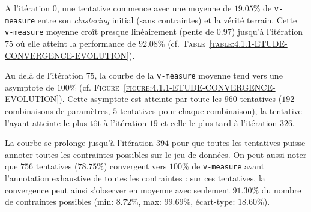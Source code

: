 			A l'itération $0$, une tentative commence avec une moyenne de $19.05$\% de \texttt{v-measure}  entre son \textit{clustering} initial (sans contraintes) et la vérité terrain.
			Cette \texttt{v-measure} moyenne croît presque linéairement (pente de $0.97$) jusqu'à l'itération $75$ où elle atteint la performance de $92.08$\% (cf. \textsc{Table~\ref{table:4.1.1-ETUDE-CONVERGENCE-EVOLUTION}}).

			Au delà de l'itération $75$, la courbe de la \texttt{v-measure} moyenne tend vers une asymptote de $100$\% (cf. \textsc{Figure~\ref{figure:4.1.1-ETUDE-CONVERGENCE-EVOLUTION}}).
			Cette asymptote est atteinte par toute les $960$ tentatives ($192$ combinaisons de paramètres, $5$ tentatives pour chaque combinaison), la tentative l'ayant atteinte le plus tôt à l'itération $19$ et celle le plus tard à l'itération $326$.
			
			La courbe se prolonge jusqu'à l'itération $394$ pour que toutes les tentatives puisse annoter toutes les contraintes possibles sur le jeu de données.
			On peut aussi noter que $756$ tentatives ($78.75$\%) convergent vers $100$\% de \texttt{v-measure} avant l'annotation exhaustive de toutes les contraintes : sur ces tentatives, la convergence peut ainsi s'observer en moyenne avec seulement $91.30$\% du nombre de contraintes possibles (min: $8.72$\%, max: $99.69$\%, écart-type: $18.60$\%).
			
